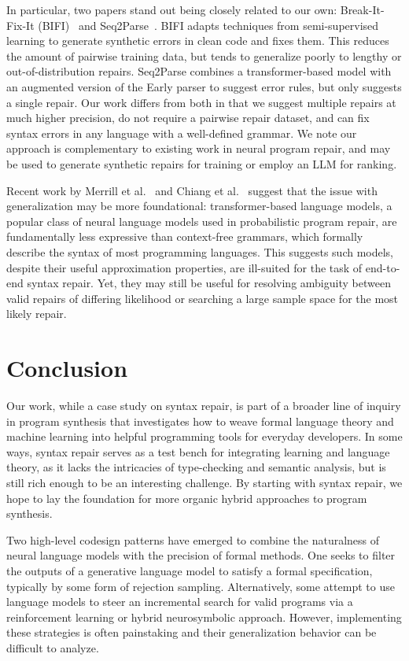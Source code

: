 \documentclass[sigplan,acmsmall,nonacm,screen]{acmart}\settopmatter{printfolios=false,printccs=false,printacmref=false}
\begin{document}
  In particular, two papers stand out being closely related to our own: Break-It-Fix-It (BIFI)~\cite{yasunaga2021break} and Seq2Parse~\cite{sakkas2022seq2parse}. BIFI adapts techniques from semi-supervised learning to generate synthetic errors in clean code and fixes them. This reduces the amount of pairwise training data, but tends to generalize poorly to lengthy or out-of-distribution repairs. Seq2Parse combines a transformer-based model with an augmented version of the Early parser to suggest error rules, but only suggests a single repair. Our work differs from both in that we suggest multiple repairs at much higher precision, do not require a pairwise repair dataset, and can fix syntax errors in any language with a well-defined grammar. We note our approach is complementary to existing work in neural program repair, and may be used to generate synthetic repairs for training or employ an LLM for ranking.

  Recent work by Merrill et al.~\cite{merrill2022saturated} and Chiang et al.~\cite{chiang2023tighter} suggest that the issue with generalization may be more foundational: transformer-based language models, a popular class of neural language models used in probabilistic program repair, are fundamentally less expressive than context-free grammars, which formally describe the syntax of most programming languages. This suggests such models, despite their useful approximation properties, are ill-suited for the task of end-to-end syntax repair. Yet, they may still be useful for resolving ambiguity between valid repairs of differing likelihood or searching a large sample space for the most likely repair.

\clearpage\section{Conclusion}\label{sec:conclusion}

  Our work, while a case study on syntax repair, is part of a broader line of inquiry in program synthesis that investigates how to weave formal language theory and machine learning into helpful programming tools for everyday developers. In some ways, syntax repair serves as a test bench for integrating learning and language theory, as it lacks the intricacies of type-checking and semantic analysis, but is still rich enough to be an interesting challenge. By starting with syntax repair, we hope to lay the foundation for more organic hybrid approaches to program synthesis.

  Two high-level codesign patterns have emerged to combine the naturalness of neural language models with the precision of formal methods. One seeks to filter the outputs of a generative language model to satisfy a formal specification, typically by some form of rejection sampling. Alternatively, some attempt to use language models to steer an incremental search for valid programs via a reinforcement learning or hybrid neurosymbolic approach. However, implementing these strategies is often painstaking and their generalization behavior can be difficult to analyze.
\end{document}
